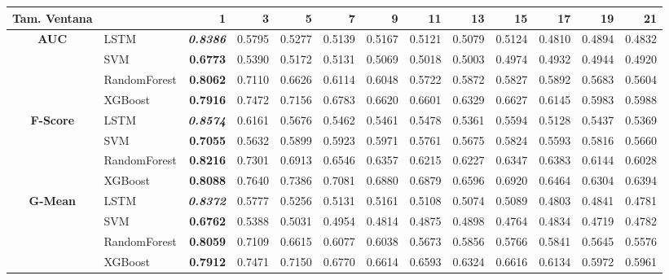 \begin{table}[H]
	\centering
	\begin{adjustbox}{max width=12cm}
		\begin{tabular}{|c|l|r|r|r|r|r|r|r|r|r|r|r|}
			\hline
			\textbf{Tam. Ventana}&         &      1  &      3  &      5  &      7  &      9  &      11 &      13 &      15 &      17 &      19 &      21 \\
			\hline
			\textbf{AUC} &  LSTM & \textit{ \textbf{  0.8386 } } &  0.5795 &  0.5277 &  0.5139 &  0.5167 &  0.5121 &  0.5079 &  0.5124 &  0.4810 &  0.4894 &  0.4832 \\
			&  SVM & \textbf{  0.6773 } &  0.5390 &  0.5172 &  0.5131 &  0.5069 &  0.5018 &  0.5003 &  0.4974 &  0.4932 &  0.4944 &  0.4920 \\
			&  RandomForest & \textbf{  0.8062 } &  0.7110 &  0.6626 &  0.6114 &  0.6048 &  0.5722 &  0.5872 &  0.5827 &  0.5892 &  0.5683 &  0.5604 \\
			&  XGBoost & \textbf{  0.7916 } &  0.7472 &  0.7156 &  0.6783 &  0.6620 &  0.6601 &  0.6329 &  0.6627 &  0.6145 &  0.5983 &  0.5988 \\
			\hline
			\textbf{F-Score} &  LSTM & \textit{ \textbf{  0.8574 } } &  0.6161 &  0.5676 &  0.5462 &  0.5461 &  0.5478 &  0.5361 &  0.5594 &  0.5128 &  0.5437 &  0.5369 \\
			&  SVM & \textbf{  0.7055 } &  0.5632 &  0.5899 &  0.5923 &  0.5971 &  0.5761 &  0.5675 &  0.5824 &  0.5593 &  0.5816 &  0.5660 \\
			&  RandomForest & \textbf{  0.8216 } &  0.7301 &  0.6913 &  0.6546 &  0.6357 &  0.6215 &  0.6227 &  0.6347 &  0.6383 &  0.6144 &  0.6028 \\
			&  XGBoost & \textbf{  0.8088 } &  0.7640 &  0.7386 &  0.7081 &  0.6880 &  0.6879 &  0.6596 &  0.6920 &  0.6464 &  0.6304 &  0.6394 \\
			\hline
			\textbf{G-Mean} &  LSTM & \textit{ \textbf{  0.8372 } } &  0.5777 &  0.5256 &  0.5131 &  0.5161 &  0.5108 &  0.5074 &  0.5089 &  0.4803 &  0.4841 &  0.4781 \\
			&  SVM & \textbf{  0.6762 } &  0.5388 &  0.5031 &  0.4954 &  0.4814 &  0.4875 &  0.4898 &  0.4764 &  0.4834 &  0.4719 &  0.4782 \\
			&  RandomForest & \textbf{  0.8059 } &  0.7109 &  0.6615 &  0.6077 &  0.6038 &  0.5673 &  0.5856 &  0.5766 &  0.5841 &  0.5645 &  0.5576 \\
			&  XGBoost & \textbf{  0.7912 } &  0.7471 &  0.7150 &  0.6770 &  0.6614 &  0.6593 &  0.6324 &  0.6616 &  0.6134 &  0.5972 &  0.5961 \\

\end{tabular}
\end{adjustbox}
\end{table}
